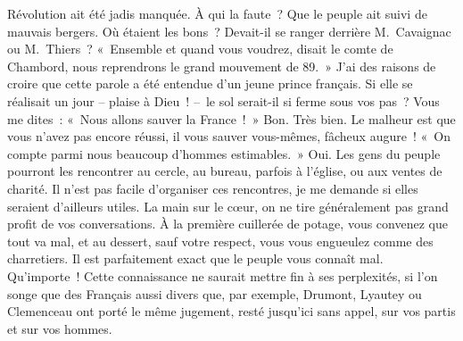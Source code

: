 \documentclass[french,twoside]{book} %
\newcommand{\astertri}{\medskip\par\centerline{\color{rubric}\large\selectfont{\syms ✻\,✻\,✻}}\medskip\par}%
\begin{document}
Révolution ait été jadis manquée. À qui la faute ? Que le peuple ait suivi de mauvais bergers. Où étaient les bons ? Devait-il se ranger derrière M. Cavaignac ou M. Thiers ? « Ensemble et quand vous voudrez, disait le comte de Chambord, nous reprendrons le grand mouvement de 89. » J’ai des raisons de croire que cette parole a été entendue d’un jeune prince français. Si elle se réalisait un jour – plaise à Dieu ! – le sol serait-il si ferme sous vos pas ? Vous me dites : « Nous allons sauver la France ! » Bon. Très bien. Le malheur est que vous n’avez pas encore réussi, il vous sauver vous-mêmes, fâcheux augure ! « On compte parmi nous beaucoup d’hommes estimables. » Oui. Les gens du peuple pourront les rencontrer au cercle, au bureau, parfois à l’église, ou aux ventes de charité. Il n’est pas facile d’organiser ces rencontres, je me demande si elles seraient d’ailleurs utiles. La main sur le cœur, on ne tire généralement pas grand profit de vos conversations. À la première cuillerée de potage, vous convenez que tout va mal, et au dessert, sauf votre respect, vous vous engueulez comme des charretiers. Il est parfaitement exact que le peuple vous connaît mal. Qu’importe ! Cette connaissance ne saurait mettre fin à ses perplexités, si l’on songe que des Français aussi divers que, par exemple, Drumont, Lyautey ou Clemenceau ont porté le même jugement, resté jusqu’ici sans appel, sur vos partis et sur vos hommes.\par

\astertri
\end{document}
